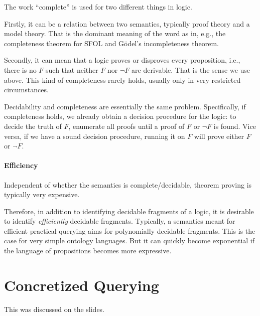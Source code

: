 \begin{remark}
The work ``complete'' is used for two different things in logic.

Firstly, it can be a relation between two semantics, typically proof theory and a model theory.
That is the dominant meaning of the word as in, e.g., the completeness theorem for SFOL and G\"odel's incompleteness theorem.

Secondly, it can mean that a logic proves or disproves every proposition, i.e., there is no $F$ such that neither $F$ nor $\neg F$ are derivable.
That is the sense we use above.
This kind of completeness rarely holds, usually only in very restricted circumstances.
\end{remark}

Decidability and completeness are essentially the same problem.
Specifically, if completeness holds, we already obtain a decision procedure for the logic: to decide the truth of $F$, enumerate all proofs until a proof of $F$ or $\neg F$ is found.
Vice versa, if we have a sound decision procedure, running it on $F$ will prove either $F$ or $\neg F$.

\paragraph{Efficiency}
Independent of whether the semantics is complete/decidable, theorem proving is typically very expensive.

Therefore, in addition to identifying decidable fragments of a logic, it is desirable to identify \emph{efficiently} decidable fragments.
Typically, a semantics meant for efficient practical querying aims for polynomially decidable fragments.
This is the case for very simple ontology languages.
But it can quickly become exponential if the language of propositions becomes more expressive.

\section{Concretized Querying}\label{sec:bolquery:conc}

This was discussed on the slides.

